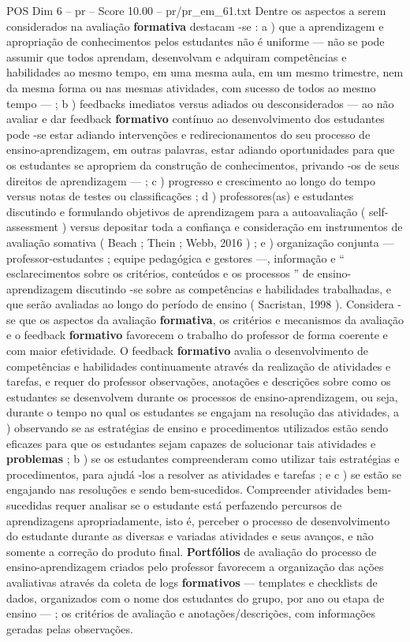 \begin{textsample}{POS Dim 6 – pr – Score 10.00 – pr/pr\_em\_61.txt}
Dentre os aspectos a serem considerados na avaliação \textbf{formativa} destacam -se : a ) que a aprendizagem e apropriação de conhecimentos pelos estudantes não é uniforme — não se pode assumir que todos aprendam, desenvolvam e adquiram competências e habilidades ao mesmo tempo, em uma mesma aula, em um mesmo trimestre, nem da mesma forma ou nas mesmas atividades, com sucesso de todos ao mesmo tempo — ; b ) feedbacks imediatos versus adiados ou desconsiderados — ao não avaliar e dar feedback \textbf{formativo} contínuo ao desenvolvimento dos estudantes pode -se estar adiando intervenções e redirecionamentos do seu processo de ensino-aprendizagem, em outras palavras, estar adiando oportunidades para que os estudantes se apropriem da construção de conhecimentos, privando -os de seus direitos de aprendizagem — ; c ) progresso e crescimento ao longo do tempo versus notas de testes ou classificações ; d ) professores(as) e estudantes discutindo e formulando objetivos de aprendizagem para a autoavaliação ( self-assessment ) versus depositar toda a confiança e consideração em instrumentos de avaliação somativa ( Beach ; Thein ; Webb, 2016 ) ; e ) organização conjunta — professor-estudantes ; equipe pedagógica e gestores —, informação e “ esclarecimentos sobre os critérios, conteúdos e os processos ” de ensino-aprendizagem discutindo -se sobre as competências e habilidades trabalhadas, e que serão avaliadas ao longo do período de ensino ( Sacristan, 1998 ).
Considera -se que os aspectos da avaliação \textbf{formativa}, os critérios e mecanismos da avaliação e o feedback \textbf{formativo} favorecem o trabalho do professor de forma coerente e com maior efetividade.
O feedback \textbf{formativo} avalia o desenvolvimento de competências e habilidades continuamente através da realização de atividades e tarefas, e requer do professor observações, anotações e descrições sobre como os estudantes se desenvolvem durante os processos de ensino-aprendizagem, ou seja, durante o tempo no qual os estudantes se engajam na resolução das atividades, a ) observando se as estratégias de ensino e procedimentos utilizados estão sendo eficazes para que os estudantes sejam capazes de solucionar tais atividades e \textbf{problemas} ; b ) se os estudantes compreenderam como utilizar tais estratégias e procedimentos, para ajudá -los a resolver as atividades e tarefas ; e c ) se estão se engajando nas resoluções e sendo bem-sucedidos.
Compreender atividades bem-sucedidas requer analisar se o estudante está perfazendo percursos de aprendizagens apropriadamente, isto é, perceber o processo de desenvolvimento do estudante durante as diversas e variadas atividades e seus avanços, e não somente a correção do produto final. \textbf{Portfólios} de avaliação do processo de ensino-aprendizagem criados pelo professor favorecem a organização das ações avaliativas através da coleta de logs \textbf{formativos} — templates e checklists de dados, organizados com o nome dos estudantes do grupo, por ano ou etapa de ensino — ; os critérios de avaliação e anotações/descrições, com informações geradas pelas observações.

\end{textsample}
